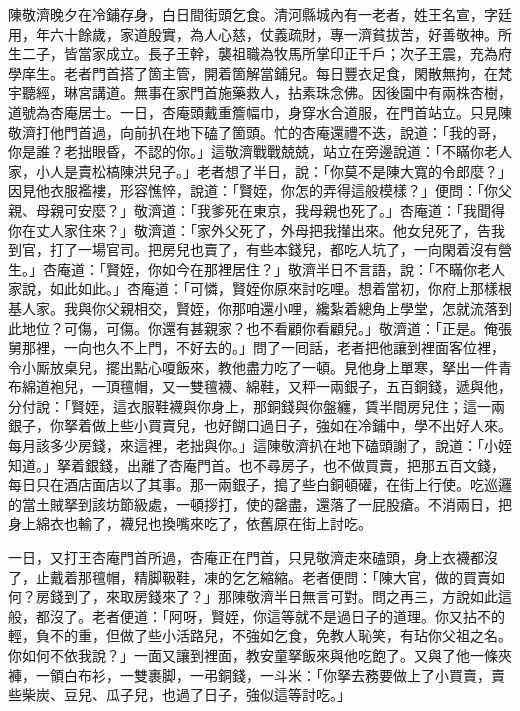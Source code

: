 陳敬濟晚夕在冷鋪存身，白日間街頭乞食。清河縣城內有一老者，姓王名宣，字廷用，年六十餘歲，家道殷實，為人心慈，仗義疏財，專一濟貧拔苦，好善敬神。所生二子，皆當家成立。長子王幹，襲祖職為牧馬所掌印正千戶；次子王震，充為府學庠生。老者門首搭了箇主管，開着箇解當鋪兒。每日豐衣足食，閑散無拘，在梵宇聽經，琳宮講道。無事在家門首施藥救人，拈素珠念佛。因後園中有兩株杏樹，道號為杏庵居士。一日，杏庵頭戴重簷幅巾，身穿水合道服，在門首站立。只見陳敬濟打他門首過，向前扒在地下磕了箇頭。忙的杏庵還禮不迭，說道：「我的哥，你是誰？老拙眼昏，不認的你。」這敬濟戰戰兢兢，站立在旁邊說道：「不瞞你老人家，小人是賣松槁陳洪兒子。」老者想了半日，說：「你莫不是陳大寬的令郎麼？」{}因見他衣服襤褸，形容憔悴，說道：「賢姪，你怎的弄得這般模樣？」便問：「你父親、母親可安麼？」敬濟道：「我爹死在東京，我母親也死了。」杏庵道：「我聞得你在丈人家住來？」敬濟道：「家外父死了，外母把我攆出來。他女兒死了，告我到官，打了一場官司。把房兒也賣了，有些本錢兒，都吃人坑了，一向閑着沒有營生。」杏庵道：「賢姪，你如今在那裡居住？」敬濟半日不言語，說：「不瞞你老人家說，如此如此。」{}杏庵道：「可憐，賢姪你原來討吃哩。想着當初，你府上那樣根基人家。我與你父親相交，賢姪，你那咱還小哩，纔紮着總角上學堂，怎就流落到此地位？可傷，可傷。你還有甚親家？也不看顧你看顧兒。」敬濟道：「正是。俺張舅那裡，一向也久不上門，不好去的。」問了一囘話，老者把他讓到裡面客位裡，令小厮放桌兒，擺出點心嗄飯來，教他盡力吃了一頓。見他身上單寒，拏出一件青布綿道袍兒，一頂氊帽，又一雙氊襪、綿鞋，又秤一兩銀子，五百銅錢，遞與他，分付說：「賢姪，這衣服鞋襪與你身上，那銅錢與你盤纏，賃半間房兒住；這一兩銀子，你拏着做上些小買賣兒，也好餬口過日子，強如在冷鋪中，學不出好人來。{}每月該多少房錢，來這裡，老拙與你。」這陳敬濟扒在地下磕頭謝了，說道：「小姪知道。」拏着銀錢，出離了杏庵門首。也不尋房子，也不做買賣，把那五百文錢，每日只在酒店面店以了其事。{}那一兩銀子，搗了些白銅頓礶，在街上行使。{}吃巡邏的當土賊拏到該坊節級處，一頓拶打，使的罄盡，還落了一屁股瘡。不消兩日，把身上綿衣也輸了，襪兒也換嘴來吃了，依舊原在街上討吃。

一日，又打王杏庵門首所過，杏庵正在門首，只見敬濟走來磕頭，身上衣襪都沒了，止戴着那氊帽，精脚靸鞋，凍的乞乞縮縮。老者便問：「陳大官，做的買賣如何？房錢到了，來取房錢來了？」那陳敬濟半日無言可對。問之再三，方說如此這般，都沒了。老者便道：「阿呀，賢姪，你這等就不是過日子的道理。你又拈不的輕，負不的重，但做了些小活路兒，不強如乞食，免教人恥笑，有玷你父祖之名。你如何不依我說？」一面又讓到裡面，教安童拏飯來與他吃飽了。又與了他一條夾褲，一領白布衫，一雙裹脚，一弔銅錢，一斗米：「你拏去務要做上了小買賣，賣些柴炭、豆兒、瓜子兒，也過了日子，強似這等討吃。」

